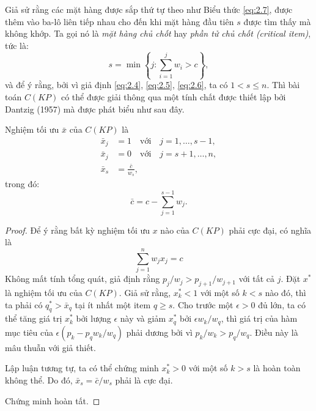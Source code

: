 Giả sử rằng các mặt hàng được sắp thứ tự theo như Biểu thức \eqref{eq:2.7}, được thêm vào ba-lô liên tiếp nhau cho đến khi mặt hàng đầu tiên $s$ được tìm thấy mà không khớp. Ta gọi nó là \textit{mặt hàng chủ chốt} hay \textit{phần tử chủ chốt (critical item)}, tức là:
\begin{equation}
    \label{eq:2.8}
    s = \min\left\{j : \sum_{i = 1}^jw_i > c\right\},
\end{equation}
và để ý rằng, bởi vì giả định \eqref{eq:2.4}, \eqref{eq:2.5}, \eqref{eq:2.6}, ta có $1 < s \leq n$. Thì bài toán $C(KP)$ có thể được giải thông qua một tính chất được thiết lập bởi Dantzig (1957) mà được phát biểu như sau đây.

\begin{theorem}
    \label{theorem:optimal_solution_ckp}
    Nghiệm tối ưu $\bar{x}$ của $C(KP)$ là 
    \begin{align}
        \bar{x}_j &= 1 \quad \text{với}\quad j = 1, \dots, s - 1,\\
        \bar{x}_j &= 0 \quad \text{với}\quad j = s + 1, \dots, n,\\
        \bar{x}_s &= \frac{\bar{c}}{w_s},
    \end{align}
    trong đó:
    \begin{equation}
        \label{eq:2.9}
        \bar{c} = c - \sum_{j = 1}^{s - 1}w_j.
    \end{equation}
\end{theorem}
\begin{proof}
    Để ý rằng bất kỳ nghiệm tối ưu $x$ nào của $C(KP)$ phải cực đại, có nghĩa là
    \begin{equation*}
        \sum_{j = 1}^n w_jx_j = c
    \end{equation*}
    Không mất tính tổng quát, giả định rằng $p_j/w_j > p_{j+1} / w_{j+1}$ với tất cả $j$. Đặt $x^*$ là nghiệm tối ưu của $C(KP)$. Giả sử rằng, $x_k^* < 1$ với một số $k < s$ nào đó, thì ta phải có $q^*_q > \bar{x}_q$ tại ít nhất một item $q \geq s$. Cho trước một $\epsilon > 0$ đủ lớn, ta có thể tăng giá trị $x^*_k$ bởi lượng $\epsilon$ này và giảm $x^*_q$ bởi $\epsilon w_k / w_q$, thì giá trị của hàm mục tiêu của $\epsilon(p_k - p_q w_k/w_q)$ phải dương bởi vì $p_k/w_k > p_q / w_q$. Điều này là mâu thuẫn với giả thiết. 

    Lập luận tương tự, ta có thể chứng minh $x^*_k >0 $ với một số $k > s$ là hoàn toàn không thể. Do đó, $\bar{x}_s = \bar{c}/w_s$ phải là cực đại.

    Chứng minh hoàn tất.
\end{proof}

